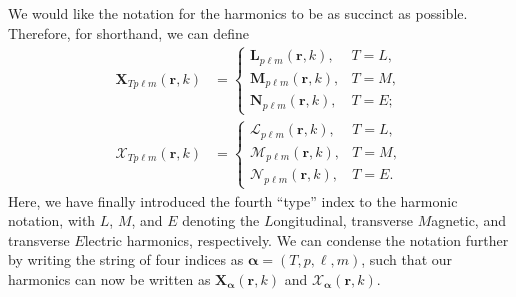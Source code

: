 We would like the notation for the harmonics to be as succinct as possible. Therefore, for shorthand, we can define
\begin{equation}
\begin{split}
\mathbf{X}_{Tp\ell m}(\mathbf{r},k) &= 
\begin{cases}
\mathbf{L}_{p\ell m}(\mathbf{r},k), & T=L,\\
\mathbf{M}_{p\ell m}(\mathbf{r},k), & T=M,\\
\mathbf{N}_{p\ell m}(\mathbf{r},k), & T=E;
\end{cases}\\[1.0em]
\bm{\mathcal{X}}_{Tp\ell m}(\mathbf{r},k) &=
\begin{cases}
\bm{\mathcal{L}}_{p\ell m}(\mathbf{r},k), & T=L,\\
\bm{\mathcal{M}}_{p\ell m}(\mathbf{r},k), & T=M,\\
\bm{\mathcal{N}}_{p\ell m}(\mathbf{r},k), & T=E.
\end{cases}
\end{split}
\end{equation}
Here, we have finally introduced the fourth ``type'' index to the harmonic notation, with $L$, $M$, and $E$ denoting the $L$ongitudinal, transverse $M$agnetic, and transverse $E$lectric harmonics, respectively. We can condense the notation further by writing the string of four indices as $\bm{\alpha} = (T,p,\ell,m)$, such that our harmonics can now be written as $\mathbf{X}_{\bm{\alpha}}(\mathbf{r},k)$ and $\bm{\mathcal{X}}_{\bm{\alpha}}(\mathbf{r},k)$.

